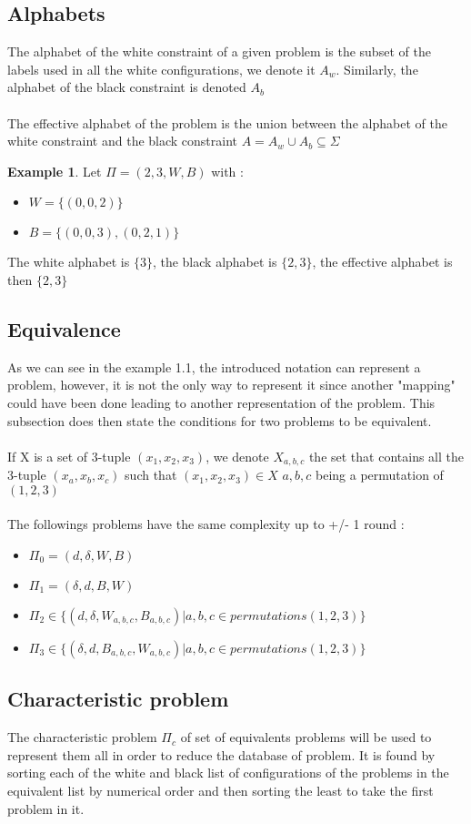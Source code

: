 \documentclass{article}
\theoremstyle{definition}
\newtheorem{exmp}{Example}[section]
\newcommand{\wdd}[0]{d}
\newcommand{\bdd}[0]{\delta}
\begin{document}
\subsection{Alphabets}
The alphabet of the white constraint of a given problem is the subset of the labels used in all the white configurations, we denote it $A_w$. Similarly, the alphabet of the black constraint is denoted $A_b$\\\\
The effective alphabet of the problem is the union between the alphabet of the white constraint and the black constraint $A = A_w \cup A_b \subseteq \Sigma$
\newpage
\begin{exmp}
Let $\Pi = (2,3,W,B)$ with :
\begin{itemize}
    \item $W = \{(0,0,2)\}$
    \item $B = \{(0,0,3),(0,2,1)\}$
\end{itemize}
The white alphabet is $\{3\}$, the black alphabet is $\{2,3\}$, the effective alphabet is then $\{2,3\}$
\end{exmp}
\subsection{Equivalence}
As we can see in the example 1.1, the introduced notation can represent a problem, however, it is not the only way to represent it since another "mapping" could have been done leading to another representation of the problem. This subsection does then state the conditions for two problems to be equivalent.\\\\
If X is a set of 3-tuple $(x_1,x_2, x_3)$, we denote $X_{a,b,c}$ the set that contains all the 3-tuple $(x_a,x_b, x_c)$ such that $(x_1,x_2, x_3)\in X$  $a,b,c$ being a permutation of $(1,2,3) $\\\\
The followings problems have the same complexity up to +/- 1 round : 
\begin{itemize}
    \item $\Pi_0 = (\wdd,\bdd,W,B)$
    \item $\Pi_1 = (\bdd,\wdd,B,W)$
    \item $\Pi_2 \in \{(\wdd,\bdd,W_{a,b,c},B_{a,b,c}) | a,b,c \in permutations(1,2,3)\}$
    \item $\Pi_3 \in \{(\bdd,\wdd,B_{a,b,c},W_{a,b,c}) | a,b,c \in permutations(1,2,3)\}$
\end{itemize}
\subsection{Characteristic problem}
The characteristic problem $\Pi_c$ of set of equivalents problems will be used to represent them all in order to reduce the database of problem. It is found by sorting each of the white and black list of configurations of the problems in the equivalent list by numerical order and then sorting the least to take the first problem in it.
\end{document}
